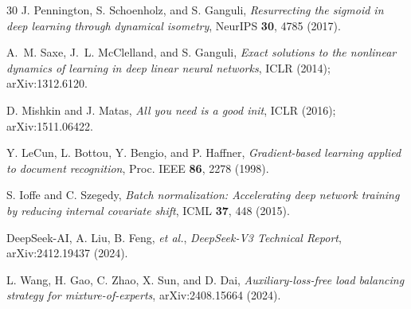\documentclass[aps,prx,onecolumn,11pt,nofootinbib,longbibliography]{revtex4-2}
\begin{document}
\begin{thebibliography}{30}
J. Pennington, S. Schoenholz, and S. Ganguli, \textit{Resurrecting the
sigmoid in deep learning through dynamical isometry}, NeurIPS \textbf{30},
4785 (2017).

A.~M. Saxe, J.~L. McClelland, and S. Ganguli, \textit{Exact solutions to
the nonlinear dynamics of learning in deep linear neural networks},
ICLR (2014); arXiv:1312.6120.

D. Mishkin and J. Matas, \textit{All you need is a good init},
ICLR (2016); arXiv:1511.06422.

Y. LeCun, L. Bottou, Y. Bengio, and P. Haffner, \textit{Gradient-based
learning applied to document recognition}, Proc. IEEE \textbf{86}, 2278
(1998).

S. Ioffe and C. Szegedy, \textit{Batch normalization: Accelerating deep
network training by reducing internal covariate shift}, ICML \textbf{37},
448 (2015).

DeepSeek-AI, A. Liu, B. Feng, \textit{et al.},
\textit{DeepSeek-V3 Technical Report},
arXiv:2412.19437 (2024).

L. Wang, H. Gao, C. Zhao, X. Sun, and D. Dai,
\textit{Auxiliary-loss-free load balancing strategy for mixture-of-experts},
arXiv:2408.15664 (2024).

\end{thebibliography}
\end{document}
